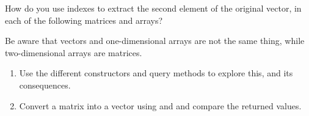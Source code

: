 \documentclass[krantz2]{krantz}\usepackage{knitr}
\begin{document}
\begin{playground}
  How do you use indexes to extract the second element of the original vector, in each of the following matrices and arrays?

\begin{knitrout}\footnotesize
{}\color{fgcolor}\begin{kframe}
\begin{alltt}
 \hlkwb{<-} \hlopt{:}
 \hlkwb{<-}   \hlstd{=} \hlstd{)}
 \hlkwb{<-}   \hlstd{=} \hlstd{,}  \hlstd{=} \hlstd{)}
 \hlkwb{<-}   \hlstd{=} \hlstd{)}
 \hlkwb{<-}   \hlstd{=} \hlstd{,}  \hlstd{=} \hlstd{)}
\end{alltt}
\end{kframe}
\end{knitrout}

\begin{knitrout}\footnotesize
{}\color{fgcolor}\begin{kframe}
\begin{alltt}
 \hlkwb{<-} \hlopt{:}
 \hlkwb{<-}   \hlstd{=} \hlstd{(}\hlstd{,} \hlstd{))}
 \hlkwb{<-}   \hlstd{=} \hlstd{(}\hlstd{,} \hlstd{),}  \hlstd{=} \hlstd{(}\hlstd{,} \hlstd{(}\hlstd{,} \hlstd{)))}
 \hlkwb{<-}   \hlstd{=} \hlstd{(}\hlstd{,} \hlstd{))}
\end{alltt}
\end{kframe}
\end{knitrout}

Be aware that vectors and one-dimensional arrays are not the same thing, while two-dimensional arrays are matrices.
\begin{enumerate}
      \item Use the different constructors and query methods to explore this, and its consequences.
      \item Convert a matrix into a vector using  and  and compare the returned values.
\end{enumerate}

\end{playground}
\end{document}
